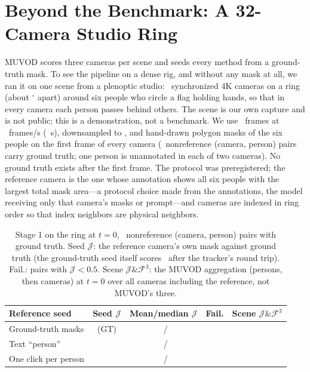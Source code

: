 \documentclass[journal]{IEEEtran}
\newcommand{\Jscore}{\ensuremath{\mathcal{J}}}
\newcommand{\JF}{\ensuremath{\mathcal{J}\&\mathcal{F}^{3}}}
\begin{document}
\section{Beyond the Benchmark: A 32-Camera Studio Ring}
\label{sec:plenoptic}

MUVOD scores three cameras per scene and seeds every method from a
ground-truth mask. To see the pipeline on a dense rig, and without any mask at
all, we ran it on one scene from a plenoptic studio: \plenCams\ synchronized 4K
cameras on a ring (about \plenRingDeg$^{\circ}$ apart) around six people who
circle a flag holding hands, so that in every camera each person passes behind
others. The scene is our own capture and is not public; this is a
demonstration, not a benchmark. We use \plenFrames\ frames at \plenFps\
frames/s (\plenSeconds\ s), downsampled to \plenRes, and hand-drawn polygon
masks of the six people on the first frame of every camera (\plenPairs\
nonreference (camera, person) pairs carry ground truth; one person is
unannotated in each of two cameras). No ground truth exists after the first
frame. The protocol was preregistered; the reference camera is the one whose
annotation shows all six people with the largest total mask area---a protocol
choice made from the annotations, the model receiving only that camera's
masks or prompt---and cameras are indexed in ring order so that index
neighbors are physical neighbors.

\begin{table}[!t]
\caption{Stage 1 on the ring at $t=0$, \plenPairs\ nonreference (camera,
person) pairs with ground truth. Seed \Jscore: the reference camera's own mask
against ground truth (the ground-truth seed itself scores \plenRefRoundTrip\
after the tracker's round trip). Fail.: pairs with $\Jscore<0.5$. Scene \JF:
the MUVOD aggregation (persons, then cameras) at $t=0$ over all \plenCams
cameras including the reference, not MUVOD's three.}
\label{tab:plen}
\centering
\footnotesize
\setlength{\tabcolsep}{3pt}
\begin{tabular}{@{}lcccc@{}}
\toprule
Reference seed & Seed \Jscore & Mean/median \Jscore & Fail. & Scene \JF \\
\midrule
Ground-truth masks   & (GT) & \plenJgt\ / \plenJgtMed & \plenFailGt & \plenQfiveGt \\
Text ``person''      & \plenSeedJtxt & \plenJtxt\ / \plenJtxtMed & \plenFailTxt & \plenQfiveTxt \\
One click per person & \plenSeedJpt & \plenJpt\ / \plenJptMed & \plenFailPt & \plenQfivePt \\
\bottomrule
\end{tabular}
\end{table}
\end{document}
